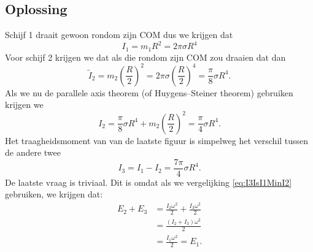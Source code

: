 \documentclass[a4paper,11pt]{article}
\begin{document}
\subsection*{Oplossing}
Schijf 1 draait gewoon rondom zijn COM dus we krijgen dat
\begin{equation}
	I_1=m_1R^2=2\pi \sigma R^4
\end{equation}
Voor schijf 2 krijgen we dat als die rondom zijn COM zou draaien dat dan
\begin{equation}
	\tilde I_2=m_2\left(\frac{R}{2}\right)^2=2\pi \sigma \left(\frac{R}{2}\right)^4=\frac{\pi}{8}\sigma R^4.
\end{equation}
Als we nu de parallele axis theorem (of Huygens–Steiner theorem) gebruiken krijgen we
\begin{equation}
	I_2=\frac{\pi}{8}\sigma R^4+m_2 \left(\frac{R}{2}\right)^2=\frac{\pi}{4}\sigma R^4.
\end{equation}
Het traagheidsmoment van van de laatste figuur is simpelweg het verschil tussen de andere twee
\begin{equation}\label{eq:I3IsI1MinI2}
	I_3=I_1-I_2=\frac{7\pi}{4}\sigma R^4.
\end{equation}
De laatste vraag is triviaal. Dit is omdat als we vergelijking \eqref{eq:I3IsI1MinI2} gebruiken, we krijgen dat:
\begin{align}
	E_2+E_3&=\frac{I_2\omega^2}{2}+\frac{I_3\omega^2}{2}\\
	&=\frac{(I_2+I_3)\omega^2}{2}\\
	&=\frac{I_1\omega^2}{2}=E_1.
\end{align}

\newpage
\end{document}
